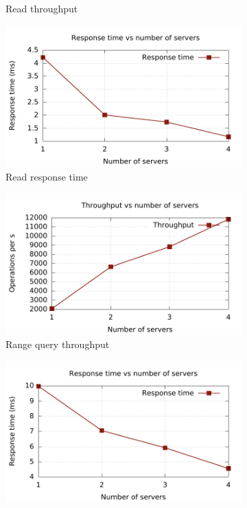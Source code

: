 \documentclass[11pt,a4paper]{globis-book}
\begin{document}
\begin{figure}
\begin{subfigure}[b]{0.5\linewidth}
        \caption{Read throughput}
        \label{fig:exp-dist-read-tp} 
    \end{subfigure}%
    \begin{subfigure}[b]{0.5\linewidth}
        \includegraphics[scale=0.5]{images/plots/read-distributed-rt}
        \caption{Read response time}
        \label{fig:exp-dist-read-rt} 
    \end{subfigure}
    \begin{subfigure}[b]{0.5\linewidth}
        \includegraphics[scale=0.5]{images/plots/range-distributed-tp}
        \caption{Range query throughput}
        \label{fig:exp-dist-range-tp} 
    \end{subfigure}%
    \begin{subfigure}[b]{0.5\linewidth}
        \includegraphics[scale=0.5]{images/plots/range-distributed-rt}

\end{subfigure}
\end{figure}
\end{document}
